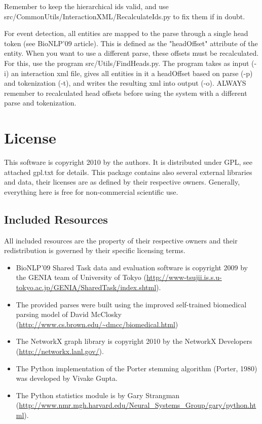 \documentclass[a4paper,12pt]{article}
\begin{document}
Remember to keep the hierarchical ids valid, and use
src/CommonUtils/InteractionXML/RecalculateIds.py to fix them if in doubt.

For event detection, all entities are mapped to the parse through a single head
token (see BioNLP'09 article). This is defined as the "headOffset" attribute of
the entity. When you want to use a different parse, these offsets must be
recalculated. For this, use the program src/Utils/FindHeads.py. The program takes
as input (-i) an interaction xml file, gives all entities in it a headOffset
based on parse (-p) and tokenization (-t), and writes the resulting xml into
output (-o). ALWAYS remember to recalculated head offsets before using the
system with a different parse and tokenization.

\section{License}

This software is copyright 2010 by the authors. It is distributed under GPL, see
attached gpl.txt for details. This package contains also several external
libraries and data, their licenses are as defined by their respective owners.
Generally, everything here is free for non-commercial scientific use.

\subsection{Included Resources}

All included resources are the property of their respective owners and their
redistribution is governed by their specific licensing terms.

\begin{itemize}
\item BioNLP'09 Shared Task data and evaluation software is copyright 2009 by
the GENIA team of University of Tokyo 
(\url{http://www-tsujii.is.s.u-tokyo.ac.jp/GENIA/SharedTask/index.shtml}).
\item The provided parses were built using the improved self-trained biomedical
parsing model of David McClosky
(\url{http://www.cs.brown.edu/~dmcc/biomedical.html})
\item The NetworkX graph library is copyright 2010 by the NetworkX Developers
(\url{http://networkx.lanl.gov/}).
\item The Python implementation of the Porter stemming algorithm (Porter, 1980)
was developed by Vivake Gupta.
\item The Python statistics module is by Gary Strangman
(\url{http://www.nmr.mgh.harvard.edu/Neural_Systems_Group/gary/python.html}).
\end{itemize}
\end{document}
